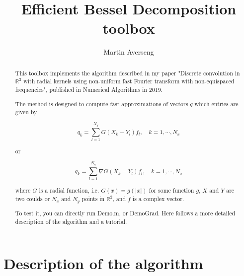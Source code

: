\documentclass[]{article}
\title{Efficient Bessel Decomposition toolbox}
\author{Martin Averseng}
\begin{document}
\maketitle

\begin{abstract}
This toolbox implements the algorithm described in my paper "Discrete convolution in $\mathbb{R}^2$ with radial kernels using non-uniform fast Fourier transform with non-equispaced frequencies", published in Numerical Algorithms in 2019.

The method is designed to compute fast approximations of vectors $q$ which entries are given by

$$q_k = \sum_{l=1}^{N_y} G(X_k - Y_l) f_l, \quad k = 1, \cdots, N_x$$

or 

$$q_k = \sum_{l=1}^{N_y} \nabla G(X_k - Y_l) f_l, \quad k = 1, \cdots, N_x$$

where $G$ is a radial function, i.e. $G(x) = g(|x|)$ for some function $g$, $X$ and $Y$ are two coulds or $N_x$ and $N_y$ points in $\mathbb{R}^2$, and $f$ is a complex vector. 

To test it, you can directly run Demo.m, or DemoGrad. Here follows a more detailed description of the algorithm and a tutorial. 
\end{abstract}

\section{Description of the algorithm}
\end{document}
